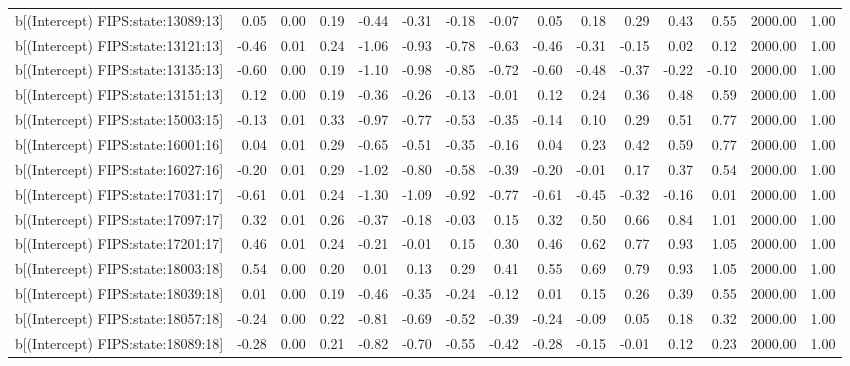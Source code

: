 \begin{table}[ht]
\begin{tabular}{rrrrrrrrrrrrrrr}
  b[(Intercept) FIPS:state:13089:13] & 0.05 & 0.00 & 0.19 & -0.44 & -0.31 & -0.18 & -0.07 & 0.05 & 0.18 & 0.29 & 0.43 & 0.55 & 2000.00 & 1.00 \\ 
  b[(Intercept) FIPS:state:13121:13] & -0.46 & 0.01 & 0.24 & -1.06 & -0.93 & -0.78 & -0.63 & -0.46 & -0.31 & -0.15 & 0.02 & 0.12 & 2000.00 & 1.00 \\ 
  b[(Intercept) FIPS:state:13135:13] & -0.60 & 0.00 & 0.19 & -1.10 & -0.98 & -0.85 & -0.72 & -0.60 & -0.48 & -0.37 & -0.22 & -0.10 & 2000.00 & 1.00 \\ 
  b[(Intercept) FIPS:state:13151:13] & 0.12 & 0.00 & 0.19 & -0.36 & -0.26 & -0.13 & -0.01 & 0.12 & 0.24 & 0.36 & 0.48 & 0.59 & 2000.00 & 1.00 \\ 
  b[(Intercept) FIPS:state:15003:15] & -0.13 & 0.01 & 0.33 & -0.97 & -0.77 & -0.53 & -0.35 & -0.14 & 0.10 & 0.29 & 0.51 & 0.77 & 2000.00 & 1.00 \\ 
  b[(Intercept) FIPS:state:16001:16] & 0.04 & 0.01 & 0.29 & -0.65 & -0.51 & -0.35 & -0.16 & 0.04 & 0.23 & 0.42 & 0.59 & 0.77 & 2000.00 & 1.00 \\ 
  b[(Intercept) FIPS:state:16027:16] & -0.20 & 0.01 & 0.29 & -1.02 & -0.80 & -0.58 & -0.39 & -0.20 & -0.01 & 0.17 & 0.37 & 0.54 & 2000.00 & 1.00 \\ 
  b[(Intercept) FIPS:state:17031:17] & -0.61 & 0.01 & 0.24 & -1.30 & -1.09 & -0.92 & -0.77 & -0.61 & -0.45 & -0.32 & -0.16 & 0.01 & 2000.00 & 1.00 \\ 
  b[(Intercept) FIPS:state:17097:17] & 0.32 & 0.01 & 0.26 & -0.37 & -0.18 & -0.03 & 0.15 & 0.32 & 0.50 & 0.66 & 0.84 & 1.01 & 2000.00 & 1.00 \\ 
  b[(Intercept) FIPS:state:17201:17] & 0.46 & 0.01 & 0.24 & -0.21 & -0.01 & 0.15 & 0.30 & 0.46 & 0.62 & 0.77 & 0.93 & 1.05 & 2000.00 & 1.00 \\ 
  b[(Intercept) FIPS:state:18003:18] & 0.54 & 0.00 & 0.20 & 0.01 & 0.13 & 0.29 & 0.41 & 0.55 & 0.69 & 0.79 & 0.93 & 1.05 & 2000.00 & 1.00 \\ 
  b[(Intercept) FIPS:state:18039:18] & 0.01 & 0.00 & 0.19 & -0.46 & -0.35 & -0.24 & -0.12 & 0.01 & 0.15 & 0.26 & 0.39 & 0.55 & 2000.00 & 1.00 \\ 
  b[(Intercept) FIPS:state:18057:18] & -0.24 & 0.00 & 0.22 & -0.81 & -0.69 & -0.52 & -0.39 & -0.24 & -0.09 & 0.05 & 0.18 & 0.32 & 2000.00 & 1.00 \\ 
  b[(Intercept) FIPS:state:18089:18] & -0.28 & 0.00 & 0.21 & -0.82 & -0.70 & -0.55 & -0.42 & -0.28 & -0.15 & -0.01 & 0.12 & 0.23 & 2000.00 & 1.00 \\ 

\end{tabular}
\end{table}
